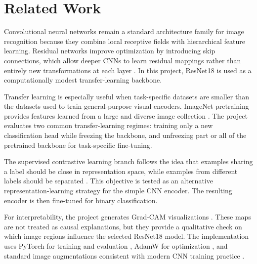 \section{Related Work}

Convolutional neural networks remain a standard architecture family for image recognition because they combine local receptive fields with hierarchical feature learning. Residual networks improve optimization by introducing skip connections, which allow deeper CNNs to learn residual mappings rather than entirely new transformations at each layer \citep{he2016deep}. In this project, ResNet18 is used as a computationally modest transfer-learning backbone.

Transfer learning is especially useful when task-specific datasets are smaller than the datasets used to train general-purpose visual encoders. ImageNet pretraining provides features learned from a large and diverse image collection \citep{deng2009imagenet}. The project evaluates two common transfer-learning regimes: training only a new classification head while freezing the backbone, and unfreezing part or all of the pretrained backbone for task-specific fine-tuning.

The supervised contrastive learning branch follows the idea that examples sharing a label should be close in representation space, while examples from different labels should be separated \citep{khosla2020supervised}. This objective is tested as an alternative representation-learning strategy for the simple CNN encoder. The resulting encoder is then fine-tuned for binary classification.

For interpretability, the project generates Grad-CAM visualizations \citep{selvaraju2017gradcam}. These maps are not treated as causal explanations, but they provide a qualitative check on which image regions influence the selected ResNet18 model. The implementation uses PyTorch for training and evaluation \citep{paszke2019pytorch}, AdamW for optimization \citep{loshchilov2019decoupled}, and standard image augmentations consistent with modern CNN training practice \citep{szegedy2016rethinking}.
